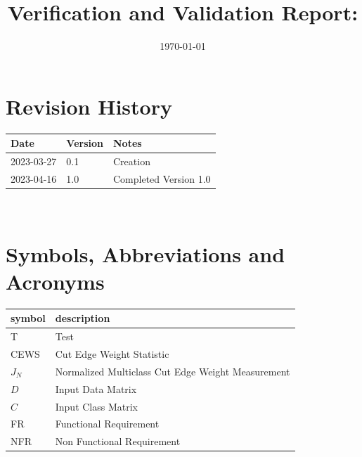\documentclass[12pt, titlepage]{article}
\begin{document}
\title{Verification and Validation Report: \progname} 
\author{\authname}
\date{\today}
	
\maketitle


\section{Revision History}

\begin{tabularx}{\textwidth}{p{3cm}p{2cm}X}
\toprule {\bf Date} & {\bf Version} & {\bf Notes}\\
\midrule
2023-03-27 & 0.1 & Creation\\
2023-04-16 & 1.0 & Completed Version 1.0\\
\bottomrule
\end{tabularx}

~\newpage

\section{Symbols, Abbreviations and Acronyms}

\renewcommand{\arraystretch}{1.2}
\begin{tabular}{l l} 
  \toprule		
  \textbf{symbol} & \textbf{description}\\
  \midrule 
  T & Test\\
  CEWS & Cut Edge Weight Statistic\\
  $J_N$ & Normalized Multiclass Cut Edge Weight Measurement\\
  $D$ & Input Data Matrix\\
  $C$ & Input Class Matrix\\
  FR & Functional Requirement \\
  NFR & Non Functional Requirement \\
  \bottomrule
\end{tabular}\\


\newpage

\tableofcontents

\newpage

\listoftables %
\end{document}
